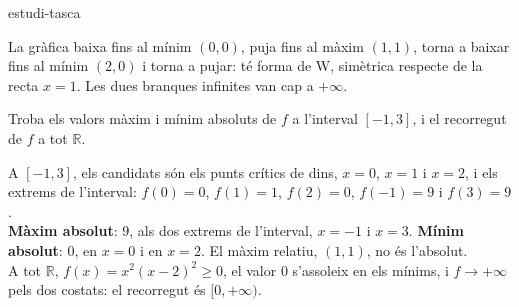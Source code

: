 \begin{apartats}
\begin{tria}{estudi-tasca}
\begin{solucio}
La gràfica baixa fins al mínim $(0,0)$, puja fins al màxim $(1,1)$, torna a baixar fins al mínim
$(2,0)$ i torna a pujar: té forma de W, simètrica respecte de la recta $x=1$. Les dues branques
infinites van cap a $+\infty$.
\begin{center}
\end{center}
\end{solucio}

Troba els valors màxim i mínim absoluts de $f$ a l'interval $[-1,3]$, i el recorregut de $f$ a tot
$\mathbb{R}$.

\begin{solucio}
A $[-1,3]$, els candidats són els punts crítics de dins, $x=0$, $x=1$ i $x=2$, i els extrems de
l'interval: $f(0)=0$, $f(1)=1$, $f(2)=0$, $f(-1)=9$ i $f(3)=9$.\\
\textbf{Màxim absolut}: $9$, als dos extrems de l'interval, $x=-1$ i $x=3$. \textbf{Mínim absolut}:
$0$, en $x=0$ i en $x=2$. El màxim relatiu, $(1,1)$, no és l'absolut.\\
A tot $\mathbb{R}$, $f(x)=x^2(x-2)^2\ge0$, el valor $0$ s'assoleix en els mínims, i $f\to+\infty$ pels
dos costats: el recorregut és $[0,+\infty)$.
\end{solucio}
\end{tria}

\end{apartats}
